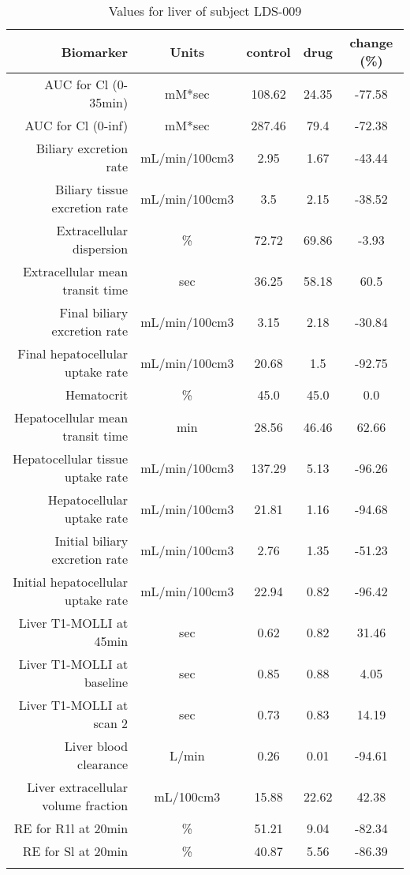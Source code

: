 \documentclass{epflreport}%
\begin{document}
%
\clearpage%
\begin{longtable}{rcccc}%
\hline%
Biomarker&Units&control&drug&change (\%)\\%
\hline%
AUC for Cl (0{-}35min)&mM*sec&108.62&24.35&{-}77.58\\%
AUC for Cl (0{-}inf)&mM*sec&287.46&79.4&{-}72.38\\%
Biliary excretion rate&mL/min/100cm3&2.95&1.67&{-}43.44\\%
Biliary tissue excretion rate&mL/min/100cm3&3.5&2.15&{-}38.52\\%
Extracellular dispersion&\%&72.72&69.86&{-}3.93\\%
Extracellular mean transit time&sec&36.25&58.18&60.5\\%
Final biliary excretion rate&mL/min/100cm3&3.15&2.18&{-}30.84\\%
Final hepatocellular uptake rate&mL/min/100cm3&20.68&1.5&{-}92.75\\%
Hematocrit&\%&45.0&45.0&0.0\\%
Hepatocellular mean transit time&min&28.56&46.46&62.66\\%
Hepatocellular tissue uptake rate&mL/min/100cm3&137.29&5.13&{-}96.26\\%
Hepatocellular uptake rate&mL/min/100cm3&21.81&1.16&{-}94.68\\%
Initial biliary excretion rate&mL/min/100cm3&2.76&1.35&{-}51.23\\%
Initial hepatocellular uptake rate&mL/min/100cm3&22.94&0.82&{-}96.42\\%
Liver T1{-}MOLLI at 45min&sec&0.62&0.82&31.46\\%
Liver T1{-}MOLLI at baseline&sec&0.85&0.88&4.05\\%
Liver T1{-}MOLLI at scan 2&sec&0.73&0.83&14.19\\%
Liver blood clearance&L/min&0.26&0.01&{-}94.61\\%
Liver extracellular volume fraction&mL/100cm3&15.88&22.62&42.38\\%
RE for R1l at 20min&\%&51.21&9.04&{-}82.34\\%
RE for Sl at 20min&\%&40.87&5.56&{-}86.39\\%
\hline%
\caption{Values for liver of subject LDS-009} \\%
\end{longtable}%
\end{document}
